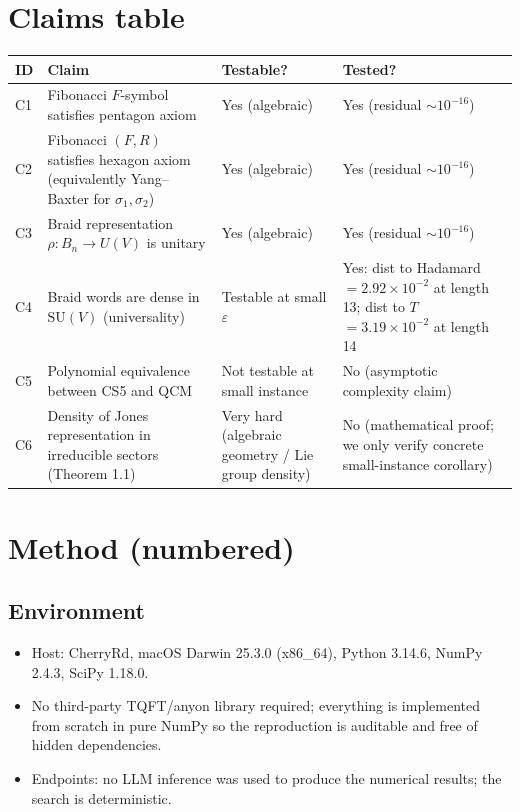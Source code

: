 \documentclass[11pt]{article}
\begin{document}
\section{Claims table}
\begin{center}
\begin{tabular}{@{}llll@{}}
\toprule
\textbf{ID} & \textbf{Claim} & \textbf{Testable?} & \textbf{Tested?}\\
\midrule
C1 & Fibonacci $F$-symbol satisfies pentagon axiom & Yes (algebraic) & Yes (residual $\sim 10^{-16}$) \\
C2 & Fibonacci $(F,R)$ satisfies hexagon axiom (equivalently Yang--Baxter for $\sigma_1,\sigma_2$) & Yes (algebraic) & Yes (residual $\sim 10^{-16}$) \\
C3 & Braid representation $\rho: B_n \to U(V)$ is unitary & Yes (algebraic) & Yes (residual $\sim 10^{-16}$) \\
C4 & Braid words are dense in $\mathrm{SU}(V)$ (universality) & Testable at small $\varepsilon$ & Yes: dist to Hadamard $= 2.92\times 10^{-2}$ at length 13; dist to $T$ $= 3.19\times 10^{-2}$ at length 14 \\
C5 & Polynomial equivalence between CS5 and QCM & Not testable at small instance & No (asymptotic complexity claim) \\
C6 & Density of Jones representation in irreducible sectors (Theorem 1.1) & Very hard (algebraic geometry / Lie group density) & No (mathematical proof; we only verify concrete small-instance corollary) \\
\bottomrule
\end{tabular}
\end{center}

\section{Method (numbered)}

\subsection{Environment}
\begin{itemize}
    \item Host: CherryRd, macOS Darwin 25.3.0 (x86\_64), Python 3.14.6, NumPy 2.4.3, SciPy 1.18.0.
    \item No third-party TQFT/anyon library required; everything is implemented from scratch in pure NumPy so the reproduction is auditable and free of hidden dependencies.
    \item Endpoints: no LLM inference was used to produce the numerical results; the search is deterministic.
\end{itemize}
\end{document}
